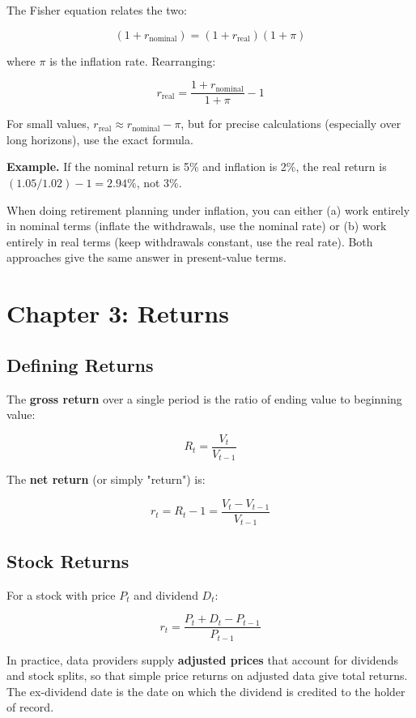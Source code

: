 \documentclass[11pt,letterpaper]{report}
\begin{document}
The Fisher equation relates the two:

$$(1 + r_{\text{nominal}}) = (1 + r_{\text{real}})(1 + \pi)$$

where $\pi$ is the inflation rate.  Rearranging:

$$r_{\text{real}} = \frac{1 + r_{\text{nominal}}}{1 + \pi} - 1$$

For small values, $r_{\text{real}} \approx r_{\text{nominal}} - \pi$, but for precise calculations (especially over long horizons), use the exact formula.

\textbf{Example.}  If the nominal return is 5\% and inflation is 2\%, the real return is $(1.05/1.02) - 1 = 2.94\%$, not 3\%.

When doing retirement planning under inflation, you can either (a) work entirely in nominal terms (inflate the withdrawals, use the nominal rate) or (b) work entirely in real terms (keep withdrawals constant, use the real rate).  Both approaches give the same answer in present-value terms.


\chapter{Chapter 3: Returns}


\section{Defining Returns}


The \textbf{gross return} over a single period is the ratio of ending value to beginning value:

$$R_t = \frac{V_t}{V_{t-1}}$$

The \textbf{net return} (or simply "return") is:

$$r_t = R_t - 1 = \frac{V_t - V_{t-1}}{V_{t-1}}$$

\section{Stock Returns}


For a stock with price $P_t$ and dividend $D_t$:

$$r_t = \frac{P_t + D_t - P_{t-1}}{P_{t-1}}$$

In practice, data providers supply \textbf{adjusted prices} that account for dividends and stock splits, so that simple price returns on adjusted data give total returns.  The ex-dividend date is the date on which the dividend is credited to the holder of record.
\end{document}
